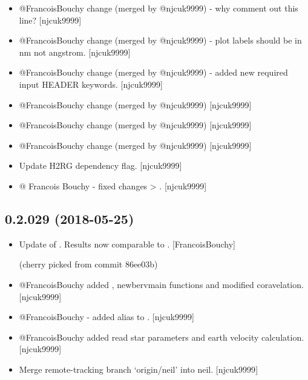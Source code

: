 \documentclass[a4paper,10pt,english]{report}
\begin{document}
\begin{itemize}
\begin{description}
\end{description}

\item {} 
@FrancoisBouchy change (merged by @njcuk9999) - why comment out this
line? {[}njcuk9999{]}

\item {} 
@FrancoisBouchy change (merged by @njcuk9999) - plot labels should be
in nm not angstrom. {[}njcuk9999{]}

\item {} 
@FrancoisBouchy change (merged by @njcuk9999) - added new required
input HEADER keywords. {[}njcuk9999{]}

\item {} 
@FrancoisBouchy change (merged by @njcuk9999) {[}njcuk9999{]}

\item {} 
@FrancoisBouchy change (merged by @njcuk9999) {[}njcuk9999{]}

\item {} 
@FrancoisBouchy change (merged by @njcuk9999) {[}njcuk9999{]}

\item {} 
Update H2RG dependency flag. {[}njcuk9999{]}

\item {} 
@ Francois Bouchy - fixed changes  \textendash{}\textgreater{} .
{[}njcuk9999{]}

\end{itemize}


\subsection{0.2.029 (2018-05-25)}
\label{\detokenize{misc/changelog:id431}}\begin{itemize}
\item {} 
Update of . Results now comparable to
. {[}FrancoisBouchy{]}

(cherry picked from commit 86ee03b)

\item {} 
@FrancoisBouchy added , newbervmain functions
and modified coravelation. {[}njcuk9999{]}

\item {} 
@FrancoisBouchy - added alias to .
{[}njcuk9999{]}

\item {} 
@FrancoisBouchy added read star parameters and earth velocity
calculation. {[}njcuk9999{]}

\item {} 
Merge remote-tracking branch ‘origin/neil’ into neil. {[}njcuk9999{]}

\end{itemize}
\end{document}
